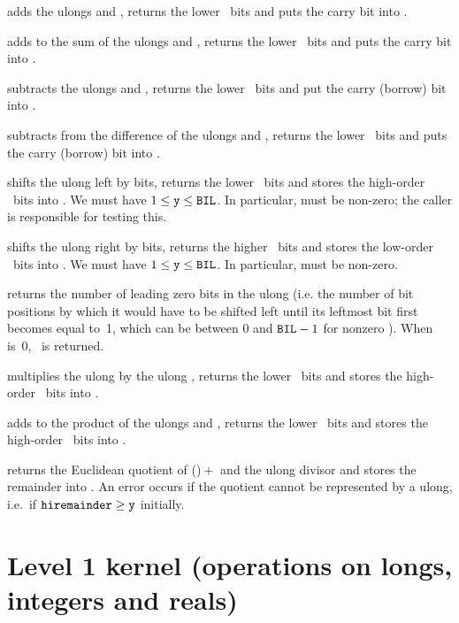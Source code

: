  adds the ulongs  and ,
returns the lower \B\ bits and puts the carry bit into .

 adds  to the sum of the
ulongs  and , returns the lower \B\ bits and puts the
carry bit into .

 subtracts the ulongs  and ,
returns the lower \B\ bits and put the carry (borrow) bit into .

 subtracts  from the
difference of the ulongs  and , returns the lower \B\ bits
and puts the carry (borrow) bit into .

 shifts the ulong  left by 
bits, returns the lower \B\ bits and stores the high-order \B\ bits into
. We must have $1\le{\tt y}\le{\tt BIL}$. In particular, 
must be non-zero; the caller is responsible for testing this.

 shifts the ulong  right
by  bits, returns the higher \B\ bits and stores the low-order
\B\ bits into . We must have $1\le{\tt y}\le{\tt BIL}$. In
particular,  must be non-zero.

 returns the number of leading zero bits in the
ulong  (i.e. the number of bit positions by which it would have to be
shifted left until its leftmost bit first becomes equal to~1, which can be
between 0 and ${\tt BIL}-1$ for nonzero ). When  is~0, \B\ is returned.

 multiplies the ulong  by the ulong
, returns the lower \B\ bits and stores the high-order \B\ bits into
.

 adds  to the product
of the ulongs  and , returns the lower \B\ bits and stores the
high-order \B\ bits into .

 returns the Euclidean quotient of
()${}+{}$ and the ulong divisor  and
stores the remainder into . An error occurs if the quotient
cannot be represented by a ulong, i.e.~if ${\tt hiremainder}\ge{\tt y}$
initially.

\section{Level 1 kernel (operations on longs, integers and reals)}

